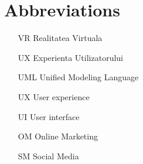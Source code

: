 \section*{Abbreviations}

\begin{itemize}[leftmargin=2cm, topsep=0pt, partopsep=5pt,itemsep=0pt,parsep=0pt]
\item[VR] Realitatea Virtuala
\item[UX] Experienta Utilizatorului

\item[UML] Unified Modeling Language
\item[UX] User experience
\item[UI] User interface
\item[OM] Online Marketing
\item[SM] Social Media

\end{itemize}